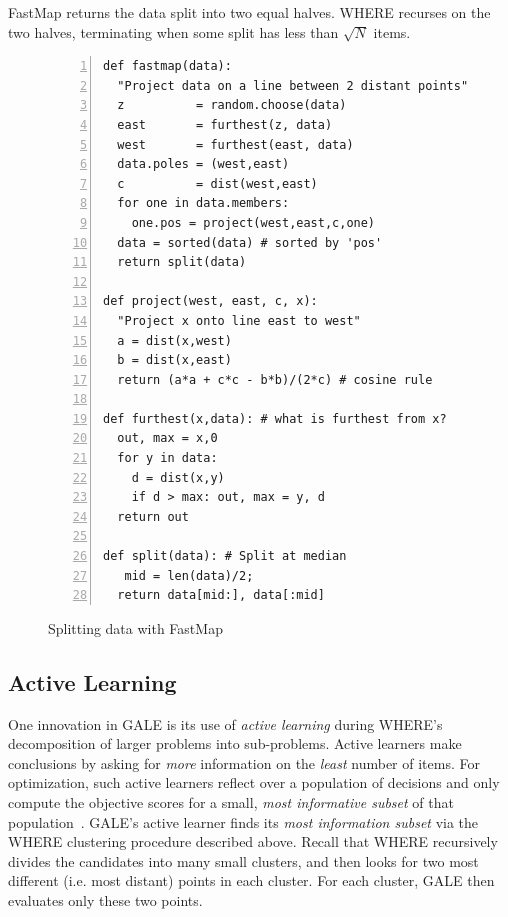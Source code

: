 \documentclass[10pt,journal,compsoc]{IEEEtran}
\begin{document}
FastMap returns the data split into two equal halves.
WHERE recurses on the two halves, terminating when some split has less than $\sqrt{N}$ items.


\begin{figure}[!b]
\hspace{0.4cm}
\begin{minipage}{3.8in}
\begin{lstlisting}[mathescape,frame=l,numbers=left]
def fastmap(data): 
  "Project data on a line between 2 distant points"
  z          = random.choose(data)
  east       = furthest(z, data)
  west       = furthest(east, data)
  data.poles = (west,east)
  c          = dist(west,east)     
  for one in data.members: 
    one.pos = project(west,east,c,one)
  data = sorted(data) # sorted by 'pos'
  return split(data)

def project(west, east, c, x): 
  "Project x onto line east to west"
  a = dist(x,west)
  b = dist(x,east)
  return (a*a + c*c - b*b)/(2*c) # cosine rule

def furthest(x,data): # what is furthest from x?
  out, max = x,0
  for y in data:
    d = dist(x,y)
    if d > max: out, max = y, d
  return out

def split(data): # Split at median
   mid = len(data)/2; 
  return data[mid:], data[:mid]
\end{lstlisting}
\caption{Splitting data with FastMap}
\label{fig:fastmapCode}  
\end{minipage}
\end{figure}

\subsection{Active Learning}

One innovation in GALE is its use of  {\em active learning} during WHERE's decomposition of larger problems into sub-problems.
Active learners make conclusions by asking for {\em more} information on the {\em least} number of items.  
For optimization,  such active learners reflect over a population of decisions and only compute the objective scores for a small, {\em most informative subset} of that population~\cite{Zuluaga:13}. 
GALE's active learner finds its {\em most information subset} via the WHERE clustering procedure described above.
Recall that
WHERE recursively divides the candidates into many small clusters, and then looks for two most different (i.e. most distant) points in each cluster. 
For each cluster, GALE then evaluates only these two points. 
\end{document}
